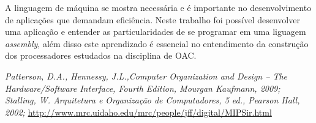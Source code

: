 \documentclass[10pt,twocolumn,letterpaper]{article}
\begin{document}
A linguagem de máquina se mostra necessária e é importante no desenvolvimento de aplicações que demandam eficiência. Neste trabalho foi possível desenvolver uma aplicação e entender as particularidades de se programar em uma liguagem \textit{assembly}, além disso este aprendizado é essencial no entendimento da construção dos processadores estudados na disciplina de OAC.



\begin{thebibliography}{xx}
\bibitem{}\textit{Patterson, D.A., Hennessy, J.L.,Computer Organization and Design – The
Hardware/Software Interface, Fourth Edition, Mourgan Kaufmann, 2009;}
\bibitem{}
\textit{Stalling, W. Arquitetura e Organização de Computadores, 5 ed., Pearson
Hall, 2002;}
\bibitem{}
\url{http://www.mrc.uidaho.edu/mrc/people/jff/digital/MIPSir.html}
\end{thebibliography}
\end{document}
